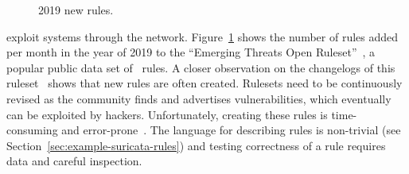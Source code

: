 \documentclass[conference]{IEEEtran}
\begin{document}
\begin{figure}
    \vspace{-2ex}  
    \centering
    \vspace{-5ex}
    \caption{\label{fig:distribution-rules-per-month}2019 new rules.}
\end{figure}
exploit systems through the
network. Figure~\ref{fig:distribution-rules-per-month} shows the
number of rules added per month in the year of 2019 to the ``Emerging
Threats Open Ruleset''~\cite{emerging-threats-open}, a popular public
data set of \suri\ rules. A closer observation on the changelogs of
this ruleset~\cite{emerging-threats-changelogs} shows that new rules
are often created.  Rulesets need to be continuously revised as the
community finds and advertises vulnerabilities, which eventually can
be exploited by hackers.  Unfortunately, creating these rules is
time-consuming and error-prone~\cite{vollmer-etal-cics2011,alparslan-blog-suri}. The language for
describing rules is non-trivial (see
Section~\ref{sec:example-suricata-rules}) and testing correctness of a
rule requires data and careful inspection.

\end{document}
